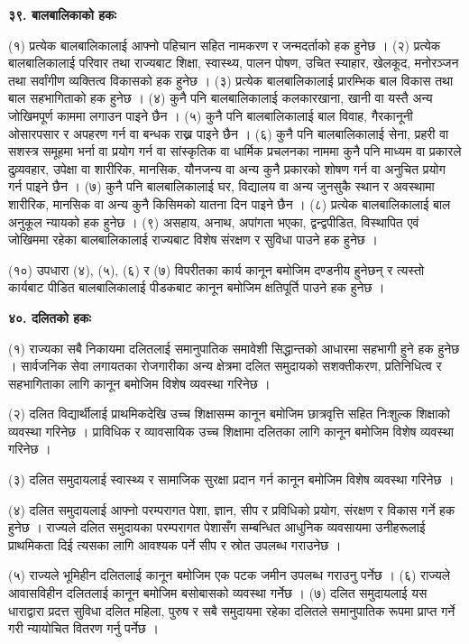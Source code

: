 \textbf{३९. बालबालिकाको हकः}

(१) प्रत्येक बालबालिकालाई आफ्नो पहिचान सहित नामकरण र जन्मदर्ताको हक हुनेछ ।
(२) प्रत्येक बालबालिकालाई परिवार तथा राज्यबाट शिक्षा, स्वास्थ्य, पालन पोषण, उचित स्याहार, खेलकूद, मनोरञ्जन तथा सर्वांगीण व्यक्तित्व विकासको हक हुनेछ ।
(३) प्रत्येक बालबालिकालाई प्रारम्भिक बाल विकास तथा बाल सहभागिताको हक हुनेछ ।
(४) कुनै पनि बालबालिकालाई कलकारखाना, खानी वा यस्तै अन्य जोखिमपूर्ण काममा लगाउन पाइने छैन ।
(५) कुनै पनि बालबालिकालाई बाल विवाह, गैरकानूनी ओसारपसार र अपहरण गर्न वा बन्धक राख्न पाइने छैन ।
(६) कुनै पनि बालबालिकालाई सेना, प्रहरी वा सशस्त्र समूहमा भर्ना वा प्रयोग गर्न वा सांस्कृतिक वा धार्मिक प्रचलनका नाममा कुनै पनि माध्यम वा प्रकारले दुव्र्यवहार, उपेक्षा वा शारीरिक, मानसिक, यौनजन्य वा अन्य कुनै प्रकारको शोषण गर्न वा अनुचित प्रयोग गर्न पाइने छैन ।
(७) कुनै पनि बालबालिकालाई घर, विद्यालय वा अन्य जुनसुकै स्थान र अवस्थामा शारीरिक, मानसिक वा अन्य कुनै किसिमको यातना दिन पाइने छैन ।
(८) प्रत्येक बालबालिकालाई बाल अनुकूल न्यायको हक हुनेछ ।
(९) असहाय, अनाथ, अपांगता भएका, द्वन्द्वपीडित, विस्थापित एवं जोखिममा रहेका बालबालिकालाई राज्यबाट विशेष संरक्षण र सुविधा पाउने हक हुनेछ ।

(१०) उपधारा (४), (५), (६) र (७) विपरीतका कार्य कानून बमोजिम दण्डनीय हुनेछन् र त्यस्तो कार्यबाट पीडित बालबालिकालाई पीडकबाट कानून बमोजिम क्षतिपूर्ति पाउने हक हुनेछ ।

\textbf{४०. दलितको हकः}

(१) राज्यका सबै निकायमा दलितलाई समानुपातिक समावेशी सिद्धान्तको आधारमा सहभागी हुने हक हुनेछ । सार्वजनिक सेवा लगायतका रोजगारीका अन्य क्षेत्रमा दलित समुदायको सशक्तीकरण, प्रतिनिधित्व र सहभागिताका लागि कानून बमोजिम विशेष व्यवस्था गरिनेछ ।

(२) दलित विद्यार्थीलाई प्राथमिकदेखि उच्च शिक्षासम्म कानून बमोजिम छात्रवृत्ति सहित निःशुल्क शिक्षाको व्यवस्था गरिनेछ । प्राविधिक र व्यावसायिक उच्च शिक्षामा दलितका लागि कानून बमोजिम विशेष व्यवस्था गरिनेछ ।

(३) दलित समुदायलाई स्वास्थ्य र सामाजिक सुरक्षा प्रदान गर्न कानून बमोजिम विशेष व्यवस्था गरिनेछ ।

(४) दलित समुदायलाई आफ्नो परम्परागत पेशा, ज्ञान, सीप र प्रविधिको प्रयोग, संरक्षण र विकास गर्ने हक हुनेछ । राज्यले दलित समुदायका परम्परागत पेशासँग सम्बन्धित आधुनिक व्यवसायमा उनीहरूलाई प्राथमिकता दिई त्यसका लागि आवश्यक पर्ने सीप र स्रोत उपलब्ध गराउनेछ ।

(५) राज्यले भूमिहीन दलितलाई कानून बमोजिम एक पटक जमीन उपलब्ध गराउनु पर्नेछ ।
(६) राज्यले आवासविहीन दलितलाई कानून बमोजिम बसोबासको व्यवस्था गर्नेछ ।
(७) दलित समुदायलाई यस धाराद्वारा प्रदत्त सुविधा दलित महिला, पुरुष र सबै समुदायमा रहेका दलितले समानुपातिक रूपमा प्राप्त गर्ने गरी न्यायोचित वितरण गर्नु पर्नेछ ।

